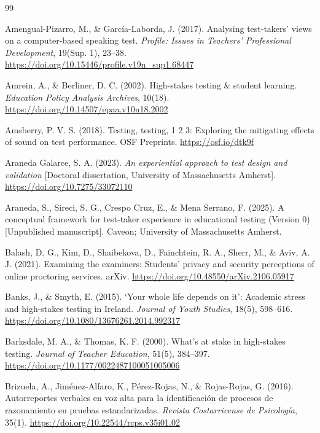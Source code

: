 \documentclass[11pt]{article}
\begin{document}

\begin{thebibliography}{99}

Amengual-Pizarro, M., \& Garc\'ia-Laborda, J. (2017). Analysing test-takers' views on a computer-based speaking test. \textit{Profile: Issues in Teachers' Professional Development}, 19(Sup. 1), 23--38. \url{https://doi.org/10.15446/profile.v19n_sup1.68447}

Amrein, A., \& Berliner, D. C. (2002). High-stakes testing \& student learning. \textit{Education Policy Analysis Archives}, 10(18). \url{https://doi.org/10.14507/epaa.v10n18.2002}

Amsberry, P. V. S. (2018). Testing, testing, 1 2 3: Exploring the mitigating effects of sound on test performance. OSF Preprints. \url{https://osf.io/dtk9f}

Araneda Galarce, S. A. (2023). \textit{An experiential approach to test design and validation} [Doctoral dissertation, University of Massachusetts Amherst]. \url{https://doi.org/10.7275/33072110}

Araneda, S., Sireci, S. G., Crespo Cruz, E., \& Mena Serrano, F. (2025). A conceptual framework for test-taker experience in educational testing (Version 0) [Unpublished manuscript]. Caveon; University of Massachusetts Amherst.

Balash, D. G., Kim, D., Shaibekova, D., Fainchtein, R. A., Sherr, M., \& Aviv, A. J. (2021). Examining the examiners: Students' privacy and security perceptions of online proctoring services. arXiv. \url{https://doi.org/10.48550/arXiv.2106.05917}

Banks, J., \& Smyth, E. (2015). `Your whole life depends on it': Academic stress and high-stakes testing in Ireland. \textit{Journal of Youth Studies}, 18(5), 598--616. \url{https://doi.org/10.1080/13676261.2014.992317}

Barksdale, M. A., \& Thomas, K. F. (2000). What's at stake in high-stakes testing. \textit{Journal of Teacher Education}, 51(5), 384--397. \url{https://doi.org/10.1177/0022487100051005006}

Brizuela, A., Jim\'enez-Alfaro, K., P\'erez-Rojas, N., \& Rojas-Rojas, G. (2016). Autorreportes verbales en voz alta para la identificaci\'on de procesos de razonamiento en pruebas estandarizadas. \textit{Revista Costarricense de Psicolog\'ia}, 35(1). \url{https://doi.org/10.22544/rcps.v35i01.02}


\end{thebibliography}
\end{document}
